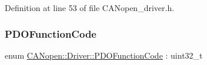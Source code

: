 Definition at line 53 of file C\+A\+Nopen\+\_\+driver.\+h.

\mbox{\label{class_c_a_nopen_1_1_driver_af1538f81dbeb9dcafee3ff1a71c95be4}} 
\subsubsection{\texorpdfstring{P\+D\+O\+Function\+Code}{PDOFunctionCode}}
{\footnotesize\ttfamily enum \hyperlink{class_c_a_nopen_1_1_driver_af1538f81dbeb9dcafee3ff1a71c95be4}{C\+A\+Nopen\+::\+Driver\+::\+P\+D\+O\+Function\+Code} \+: uint32\+\_\+t}

